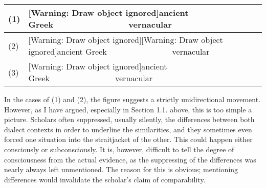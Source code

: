 \begin{flushleft}
\tablefirsthead{}
\tablehead{}
\tabletail{}
\tablelasttail{}
\begin{supertabular}{|m{0.35805985in}|m{5.48516in}|}
\hline
(1) &
[Warning: Draw object ignored]ancient Greek\ \ \ \ \ \ \ \ \ \ \ \ \ \ \ \ vernacular\\\hline
(2) &
[Warning: Draw object ignored][Warning: Draw object ignored]ancient Greek\ \ \ \ \ \ \ \ \ \ \ \ \ \ \ \ vernacular\\\hline
(3) &
[Warning: Draw object ignored]ancient Greek\ \ \ \ \ \ \ \ \ \ \ \ \ \ \ \ vernacular\\\hline
\end{supertabular}
\end{flushleft}
\begin{styleStandard}
In the cases of (1) and (2), the figure suggests a strictly unidirectional movement. However, as I have argued, especially in Section 1.1. above, this is too simple a picture. Scholars often suppressed, usually silently, the differences between both dialect contexts in order to underline the similarities, and they sometimes even forced one situation into the straitjacket of the other. This could happen either consciously or subconsciously. It is, however, difficult to tell the degree of consciousness from the actual evidence, as the suppressing of the differences was nearly always left unmentioned. The reason for this is obvious; mentioning differences would invalidate the scholar’s claim of comparability.
\end{styleStandard}

